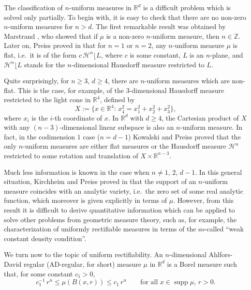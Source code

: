 \documentclass[11pt]{amsart}
\newcommand{\R}{{\mathbb R}}       %
\newcommand{\Z}{{\mathbb Z}}       %
\newcommand{\HH}{{\mathcal H}}
\newcommand{\supp}{\operatorname{supp}}
\newcommand{\rest}{{\lfloor}}
\theoremstyle{definition}
\theoremstyle{remark}
\numberwithin{equation}{section}
\begin{document}
The classification of $n$-uniform measures in $\R^d$ is
a difficult problem which is solved only partially.
 To begin with, it is easy to check that there are no non-zero $n$-uniform measures for $n>d$. The first remarkable
 result was obtained by Marstrand  \cite{Marstrand}, who showed that if $\mu$ is a non-zero $n$-uniform measure, then $n\in\Z$. Later on, Preiss proved in \cite{Pr} that
 for $n=1$ or $n=2$, any $n$-uniform measure $\mu$ is flat, i.e.\ it is of the form
 $c\,\HH^n\rest L$, where $c$ is some constant, $L$ is an $n$-plane, and $\HH^n\rest L$ stands for the $n$-dimensional Hausdorff measure restricted to $L$.
 
Quite surprisingly, for $n\geq3$, $d\geq4$, there are $n$-uniform measures which are non-flat. This is the case,
for example, of the $3$-dimensional Hausdorff measure restricted to the light cone in $\R^4$, defined by
$$X:=\{x\in\R^4:\,x_4^2= x_1^2+x_2^2+x_3^2\},$$
where $x_i$ is the $i$-th coordinate of $x$. In $\R^d$ with $d\geq 4$, the Cartesian product of $X$ with any
$(n-3)$-dimensional linear subspace is also an $n$-uniform measure.
In fact, in the codimension $1$ case ($n=d-1$) 
Kowalski and Preiss \cite{KoP} proved that the only $n$-uniform measures are either flat measures or the Hausdorff
measure $\HH^n$ restricted to some rotation and translation of $X\times \R^{n-3}$.

Much less information is known in the case when $n\neq 1$, $2$, $d-1$. In this general situation, 
Kirchheim and Preiss
proved in \cite{KiP} that the support of an $n$-uniform measure coincides with an analytic variety, i.e.\
the zero set of some real analytic function, which moreover is given explicitly in terms of $\mu$.
However, from this result it is difficult to derive quantitative information which can be applied
to solve other problems from geometric measure theory, such as, for example, the characterization of uniformly rectifiable measures in terms of the so-called ``weak constant density condition''.

We turn now to the topic of uniform rectifiability.
An $n$-dimensional Ahlfors-David regular (AD-regular, for short) measure $\mu$ in 
$\R^d$ is a Borel measure such that,
for some constant $c_1>0$, 
\begin{equation}\label{eqad1}
c_1^{-1}\,r^n\leq \mu(B(x,r))\leq c_1\,r^n\qquad\mbox{for all $x\in\supp\mu$, $r>0$.}
\end{equation}
\end{document}
